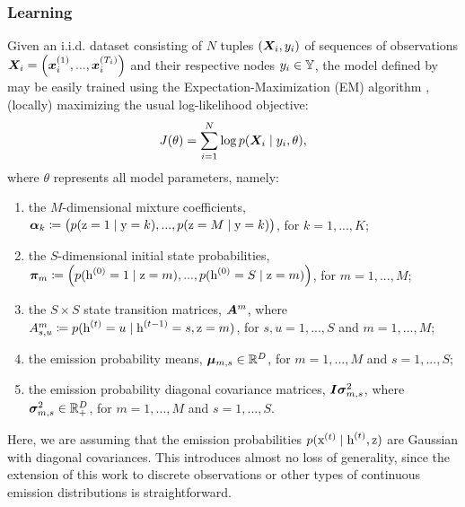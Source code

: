 \subsubsection{Learning}
\label{sec:learning}
Given an i.i.d. dataset consisting of $N$ tuples $({\bm{X}}_i, y_i)$ of sequences of observations ${\bm{X}}_i = \left({\bm{x}}_i^{(1)}, ...,{\bm{x}}_i^{(T_i)} \right)$ and their respective nodes $y_i \in {\mathbb{Y}}$, the model defined by  may be easily trained using the Expectation-Maximization (EM) algorithm \citet{Dempster1977}, (locally) maximizing the usual log-likelihood objective:
\begin{equation}
\label{log_likelihood}
J(\theta) = \sum_{i=1}^N \log p({\bm{X}}_i \mid y_i, \theta),
\end{equation}
where $\theta$ represents all model parameters, namely:
\begin{enumerate}
	\item the $M$-dimensional mixture coefficients, ${\bm{\alpha}}_k \coloneqq \left(p({\textnormal{z}}=1\mid{\textnormal{y}}=k), ..., p({\textnormal{z}}=M\mid{\textnormal{y}}=k)\right)$, for $k = 1,...,K$;
	\item the $S$-dimensional initial state probabilities, ${\bm{\pi}}_m \coloneqq \left(p({\textnormal{h}}^{(0)}=1 \mid {\textnormal{z}}=m),...,p({\textnormal{h}}^{(0)}=S \mid {\textnormal{z}}=m)\right)$, for $m = 1,...,M$;
	\item the $S \times S$ state transition matrices, ${\bm{A}}^m$, where ${A}^m_{s,u} \coloneqq p({\textnormal{h}}^{(t)}=u \mid {\textnormal{h}}^{(t-1)}=s, {\textnormal{z}}=m)$, for $s,u = 1,...,S$ and $m = 1,...,M$;
	\item the emission probability means, ${\bm{\mu}}_{m,s} \in \mathbb{R}^D$, for $m = 1,...,M$ and $s = 1,...,S$;
	\item the emission probability diagonal covariance matrices, ${\bm{I}} {\bm{\sigma}}^2_{m,s}$, where ${\bm{\sigma}}^2_{m,s} \in \mathbb{R}^{D}_{+}$, for $m = 1,...,M$ and $s = 1,...,S$.
\end{enumerate}

Here, we are assuming that the emission probabilities $p({\textnormal{x}}^{(t)}\mid{\textnormal{h}}^{(t)},{\textnormal{z}})$ are Gaussian with diagonal covariances. This introduces almost no loss of generality, since the extension of this work to discrete observations or other types of continuous emission distributions is straightforward.


